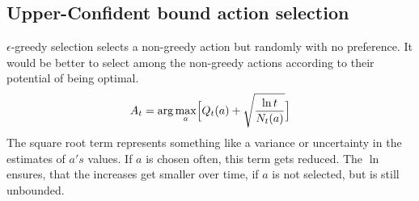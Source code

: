 \documentclass[10pt,a4paper]{article}
\begin{document}
\subsection{Upper-Confident bound action selection}
$\epsilon$-greedy selection selects a non-greedy action but randomly with no preference. 
It would be better to select among the non-greedy actions according to their potential of being optimal.
\[ A_t = \arg \max_a \Bigl[ Q_t(a) + \sqrt{\frac{\ln t}{N_t(a)}} \Bigr ] \]
The square root term represents something like a variance or uncertainty in the estimates of $a's$ values. 
If $a$ is chosen often, this term gets reduced. The $\ln$ ensures, that the increases get smaller over time, if $a$ is not selected, but is still unbounded.
\end{document}
